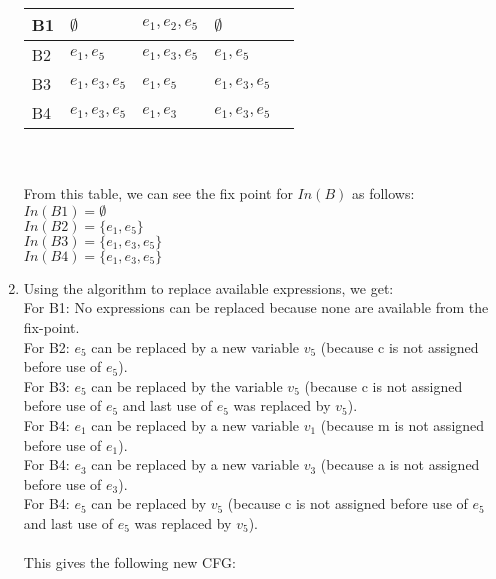 \documentclass[12pt,fleqn]{article}		%
\begin{document}
\begin{enumerate}
\begin{tabularx}{\textwidth}{| l || X | X || X | X ||}
\hline
B1 & $\emptyset$ & $e_1, e_2, e_5$ & $\emptyset$ &\\
\hline
B2 & $e_1, e_5$ & $e_1, e_3, e_5$ & $e_1, e_5$ &\\
\hline
B3 & $e_1, e_3, e_5$ & $e_1, e_5$ & $e_1, e_3, e_5$ &\\
\hline
B4 & $e_1, e_3, e_5$ & $e_1, e_3$ & $e_1, e_3, e_5$ &\\
\hline
\end{tabularx}
\\\\
From this table, we can see the fix point for $In(B)$ as follows:\\
$In(B1) = \emptyset$\\
$In(B2) = \{e_1, e_5\}$\\
$In(B3) = \{e_1, e_3, e_5\}$\\
$In(B4) = \{e_1, e_3, e_5\}$
\item Using the algorithm to replace available expressions, we get:\\
For B1: No expressions can be replaced because none are available from the fix-point.\\
For B2: $e_5$ can be replaced by a new variable $v_5$ (because c is not assigned before use of $e_5$).\\
For B3: $e_5$ can be replaced by the variable $v_5$ (because c is not assigned before use of $e_5$ and last use of $e_5$ was replaced by $v_5$).\\
For B4: $e_1$ can be replaced by a new variable $v_1$ (because m is not assigned before use of $e_1$).\\
For B4: $e_3$ can be replaced by a new variable $v_3$ (because a is not assigned before use of $e_3$).\\
For B4: $e_5$ can be replaced by $v_5$ (because c is not assigned before use of $e_5$ and last use of $e_5$ was replaced by $v_5$).
\\\\
This gives the following new CFG:\\
\begin{tikzpicture}[
  ->,
  shorten >=2pt,
  >=stealth,
  node distance=1cm,
  noname/.style={
    rectangle,
    minimum width=5em,
    text width=7em,
    minimum height=3em,
    draw
  }
]


\end{tikzpicture}
\end{enumerate}
\end{document}

